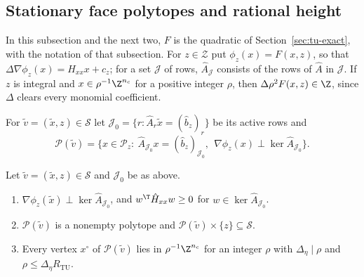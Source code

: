 \subsection{Stationary face polytopes and rational height}\label{app:tu-height}

In this subsection and the next two, $F$ is the quadratic of
Section~\ref{sec:tu-exact}, with the notation of that subsection. For
$z\in\mathcal Z$ put $\phi_z(x)=F(x,z)$, so that
$\Delta\nabla\phi_z(x)=\hat H_{xx}x+c_z$; for a set $\mathcal J$ of rows,
$\hat A_{\mathcal J}$ consists of the rows of $\hat A$ in $\mathcal J$. If $z$
is integral and $x\in\rho^{-1}\Z^{n_c}$ for a positive integer $\rho$, then
$\Delta\rho^2F(x,z)\in\Z$, since $\Delta$ clears every monomial coefficient.

\begin{definition}\label{def:tu-statpoly}
For $\tilde v=(\tilde x,z)\in\mathcal S$ let
$\mathcal J_0=\{r:\hat A_r\tilde x=(\hat b_z)_r\}$ be its active rows and
\[
\mathcal P(\tilde v)=\bigl\{x\in\mathcal P_z:\
\hat A_{\mathcal J_0}x=(\hat b_z)_{\mathcal J_0},\ \
\nabla\phi_z(x)\perp\ker\hat A_{\mathcal J_0}\bigr\}.
\]
\end{definition}

\begin{lemma}\label{lem:tu-statpoly}
Let $\tilde v=(\tilde x,z)\in\mathcal S$ and $\mathcal J_0$ be as above.
\begin{enumerate}[label=(\alph*)]
\item $\nabla\phi_z(\tilde x)\perp\ker\hat A_{\mathcal J_0}$, and
$w^{\T}\hat H_{xx}w\ge0$ for $w\in\ker\hat A_{\mathcal J_0}$.
\item $\mathcal P(\tilde v)$ is a nonempty polytope and
$\mathcal P(\tilde v)\times\{z\}\subseteq\mathcal S$.
\item Every vertex $x^\circ$ of $\mathcal P(\tilde v)$ lies in
$\rho^{-1}\Z^{n_c}$ for an integer $\rho$ with $\Delta_\eta\mid\rho$ and
$\rho\le\Delta_\eta R_{\mathrm{TU}}$.
\end{enumerate}
\end{lemma}

